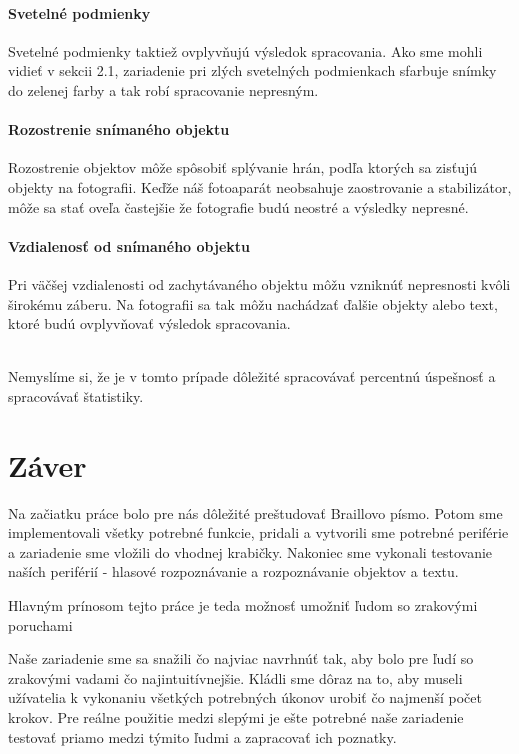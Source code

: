 \documentclass{template/socthesis}
\begin{document}
\subsubsection*{Svetelné podmienky}
Svetelné podmienky taktiež ovplyvňujú výsledok spracovania. Ako sme mohli vidieť v sekcii 2.1, zariadenie pri zlých svetelných podmienkach sfarbuje snímky do zelenej farby a tak robí spracovanie nepresným. 

\subsubsection*{Rozostrenie snímaného objektu}
Rozostrenie objektov môže spôsobiť splývanie hrán, podľa ktorých sa zisťujú objekty na fotografii. Keďže náš fotoaparát neobsahuje zaostrovanie a stabilizátor, môže sa stať oveľa častejšie že fotografie budú neostré a výsledky nepresné.

\subsubsection*{Vzdialenosť od snímaného objektu}
Pri väčšej vzdialenosti od zachytávaného objektu môžu vzniknúť nepresnosti kvôli širokému záberu. Na fotografii sa tak môžu nachádzať ďalšie objekty alebo text, ktoré budú ovplyvňovať výsledok spracovania. 

\mbox{}\\
Nemyslíme si, že je v tomto prípade dôležité spracovávať percentnú úspešnosť a spracovávať štatistiky.


\newpage
\chapter*{Záver}
Na začiatku práce bolo pre nás dôležité preštudovať Braillovo písmo. Potom sme implementovali všetky potrebné funkcie, pridali a vytvorili sme potrebné periférie a zariadenie sme vložili do vhodnej krabičky. Nakoniec sme vykonali testovanie naších periférií - hlasové rozpoznávanie a rozpoznávanie objektov a textu.
 
Hlavným prínosom tejto práce je teda možnosť umožniť ľudom so zrakovými poruchami

Naše zariadenie sme sa snažili čo najviac navrhnúť tak, aby bolo pre ľudí so zrakovými vadami čo najintuitívnejšie. Kládli sme dôraz na to, aby museli užívatelia k vykonaniu všetkých potrebných úkonov urobiť čo najmenší počet krokov. Pre reálne použitie medzi slepými je ešte potrebné naše zariadenie testovať priamo medzi týmito ľudmi a zapracovať ich poznatky. 
\end{document}
